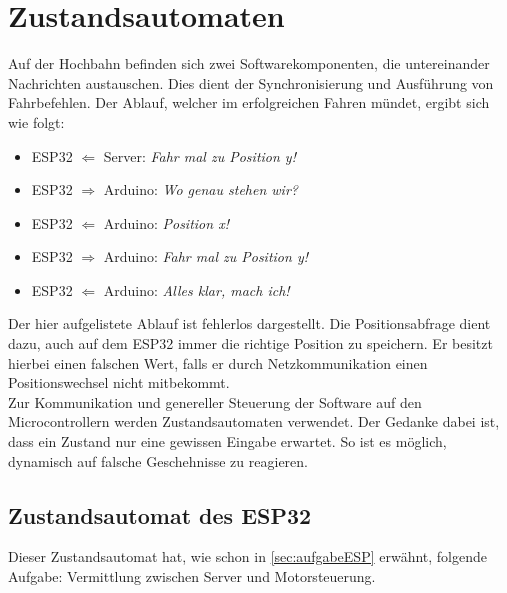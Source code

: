 \section{Zustandsautomaten}
Auf der Hochbahn befinden sich zwei Softwarekomponenten, die untereinander Nachrichten austauschen. Dies dient der Synchronisierung und Ausführung von Fahrbefehlen. Der Ablauf, welcher im erfolgreichen Fahren mündet, ergibt sich wie folgt:
\begin{center}
	\begin{itemize}
		\item ESP32 $\Leftarrow$ Server: \textit{Fahr mal zu Position y!}
		\item ESP32 $\Rightarrow$ Arduino: \textit{Wo genau stehen wir?}
		\item ESP32 $\Leftarrow$ Arduino: \textit{Position x!}
		\item ESP32 $\Rightarrow$ Arduino: \textit{Fahr mal zu Position y!}
		\item ESP32 $\Leftarrow$ Arduino: \textit{Alles klar, mach ich!}
	\end{itemize}
\end{center}
Der hier aufgelistete Ablauf ist fehlerlos dargestellt. Die Positionsabfrage dient dazu, auch auf dem ESP32 immer die richtige Position zu speichern. Er besitzt hierbei einen falschen Wert, falls er durch Netzkommunikation einen Positionswechsel nicht mitbekommt. \\
 Zur Kommunikation und genereller Steuerung der Software auf den Microcontrollern werden Zustandsautomaten verwendet. Der Gedanke dabei ist, dass ein Zustand nur eine gewissen Eingabe erwartet. So ist es möglich, dynamisch auf falsche Geschehnisse zu reagieren.

\subsection{Zustandsautomat des ESP32}
\label{sec:stateESP}
Dieser Zustandsautomat hat, wie schon in \autoref{sec:aufgabeESP} erwähnt, folgende Aufgabe: Vermittlung zwischen Server und Motorsteuerung.


